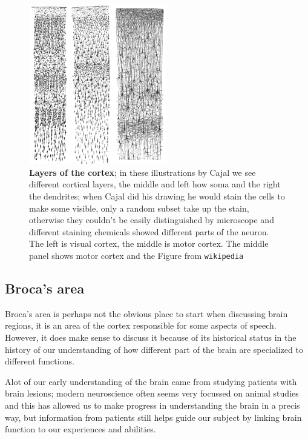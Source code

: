 \documentclass[12pt]{article}
\begin{document}
\begin{figure}[tbhp]
  \begin{center}
  \includegraphics[width=6cm]{layers.png}
\end{center}
  \caption{\textbf{Layers of the cortex}; in these illustrations by
    Cajal we see different cortical layers, the middle and left how
    soma and the right the dendrites; when Cajal did his drawing he
    would stain the cells to make some visible, only a random subset
    take up the stain, otherwise they couldn't be easily distinguished
    by microscope and different staining chemicals showed different
    parts of the neuron. The left is visual cortex, the middle is
    motor cortex. The middle panel shows motor cortex and the Figure
    from \texttt{wikipedia}\label{fig_layers}}
\end{figure}




\subsection*{Broca's area}

Broca's area is perhaps not the obvious place to start when discussing
brain regions, it is an area of the cortex responsible for some
aspects of speech. However, it does make sense to discuss it because
of its historical status in the history of our understanding of how
different part of the brain are specialized to different functions.

Alot of our early understanding of the brain came from studying
patients with brain lesions; modern neuroscience often seems very
focussed on animal studies and this has allowed us to make progress in
understanding the brain in a precis way, but information from patients
still helps guide our subject by linking brain function to our
experiences and abilities.
\end{document}
